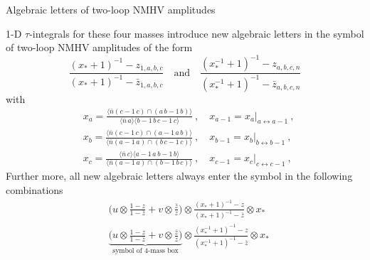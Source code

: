 \documentclass[10pt]{beamer}
\begin{document}
\begin{frame}{Algebraic letters of two-loop NMHV amplitudes}

\footnotesize{
  1-D $\tau$-integrals for these four masses introduce new algebraic letters in the symbol of two-loop NMHV amplitudes of the form 
  \[
    \frac{(x_{\ast}+1)^{-1}-z_{1,a,b,c}}{(x_{\ast}+1)^{-1}-\bar{z}_{1,a,b,c}} \quad \text{and} \quad 
    \frac{(x_{\ast}^{-1}+1)^{-1}-z_{a,b,c,n}}{(x_{\ast}^{-1}+1)^{-1}-\bar{z}_{a,b,c,n}}
  \]
 with 
 \begin{align*}
  & x_{a}=\frac{\langle\bar{n} (c{-}1\,c)\cap(a\,b{-}1\,b) \rangle}{\langle \bar{n}\,a\rangle \langle b{-}1\,b\,c{-}1\,c\rangle} \:,\quad x_{a-1}=x_{a}\vert_{a\leftrightarrow a{-}1} \:,  \nonumber \\
   &x_{b}=\frac{\langle \bar{n} (c{-}1\,c)\cap (a{-}1\,a\,b)\rangle}{\langle \bar{n} (a{-}1\,a)\cap(b\,c{-}1\,c)\rangle} \:, \quad x_{b-1}=x_{b}\vert_{b\leftrightarrow b{-}1} \:,\nonumber \\
   &x_{c}=\frac{\langle \bar{n}\,c\rangle\langle a{-}1\,a\,b{-}1\,b\rangle}{\langle \bar{n}(a{-}1\,a)\cap(b{-}1\,b\,c)\rangle} \:,\quad x_{c-1}=x_{c}\vert_{c\leftrightarrow c{-}1}\:,
 \end{align*} }
\footnotesize{
Further more, all new algebraic letters always enter the symbol in the following combinations
\begin{align*}
  &\biggl(u\otimes \frac{1-z}{1-\bar{z}}+v\otimes \frac{\bar{z}}{z}\biggr)\otimes \frac{(x_{\ast}+1)^{-1}-z}{(x_{\ast}+1)^{-1}-\bar{z}} \otimes x_{\ast} \\
  &\underbrace{\biggl(u\otimes \frac{1-z}{1-\bar{z}}+v\otimes \frac{\bar{z}}{z}\biggr)}_{\text{symbol of 4-mass box}}\otimes \frac{(x_{\ast}^{-1}+1)^{-1}-z}{(x_{\ast}^{-1}+1)^{-1}-\bar{z}} \otimes x_{\ast}
\end{align*}
}

\end{frame}
\end{document}
